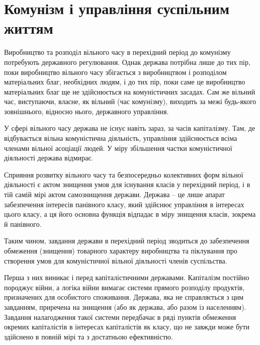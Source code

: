 \documentclass[../main]{subfiles}
\begin{document}
\ifSubfilesClassLoaded{\setcounter{page}{40}}{}
\section{Комунізм і управління суспільним життям}
\label{sec:07_kommunizm_upravlenie}

Виробництво та розподіл вільного часу в перехідний період до комунізму потребують державного регулювання. Однак держава потрібна лише до тих пір, поки виробництво вільного часу збігається з виробництвом і розподілом матеріальних благ, необхідних людям, і до тих пір, поки саме це виробництво матеріальних благ ще не здійснюється на комуністичних засадах. Сам же вільний час, виступаючи, власне, як вільний (час комунізму), виходить за межі будь-якого зовнішнього, відносно нього, державного управління.

У сфері вільного часу держава не існує навіть зараз, за часів капіталізму. Там, де відбувається вільна комуністична діяльність, управління здійснюється всіма членами вільної асоціації людей. У міру збільшення частки комуністичної діяльності держава відмирає.

Сприяння розвитку вільного часу та безпосередньо колективних форм вільної діяльності є актом знищення умов для існування класів у перехідний період, і в тій самій мірі актом самознищення держави. Держава – це лише апарат забезпечення інтересів панівного класу, який здійснює управління в інтересах цього класу, а ця його основна функція відпадає в міру знищення класів, зокрема й панівного.

Таким чином, завдання держави в перехідний період зводиться до забезпечення обмеження (знищення) товарного характеру виробництва та піклування про створення умов для комуністичної вільної діяльності членів суспільства.

Перша з них виникає і перед капіталістичними державами. Капіталізм постійно породжує війни, а логіка війни вимагає системи прямого розподілу продуктів, призначених для особистого споживання. Держава, яка не справляється з цим завданням, приречена на знищення (або як держава, або разом із населенням). Завдання налагодження такої системи передбачає в ряді пунктів обмеження окремих капіталістів в інтересах капіталістів як класу, що не завжди може бути здійснено в повній мірі та з достатньою ефективністю.
\end{document}

